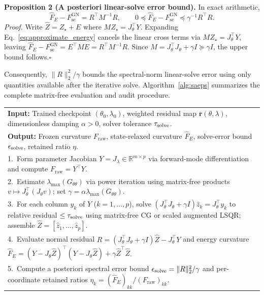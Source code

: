 \documentclass[preprint,11pt]{elsarticle}
\newcommand{\RR}{\mathbb R}
\newcommand{\rbar}{\bar{\bm r}}
\newcommand{\Jt}{J_\theta}\newcommand{\Jl}{J_\lambda}
\newcommand{\Fraw}{F_{\mathrm{raw}}}
\newcommand{\Fse}{F_{\mathrm{se}}^{\mathrm{GN}}}
\begin{document}
\medskip\noindent\textbf{Proposition 2 (A posteriori linear-solve error bound).}
In exact arithmetic,
\begin{equation}
 \widehat F_E-\Fse=R^\top M^{-1}R,\qquad
 0\preceq\widehat F_E-\Fse\preceq\gamma^{-1}R^\top R.
 \label{eq:energy_certificate}
\end{equation}
\emph{Proof.}
Write $\widehat Z=Z_\star+E$ where $MZ_\star=\Jt^\top Y$.
Expanding Eq.~\eqref{eq:approximate_energy} cancels the linear cross terms via $M Z_\star=\Jt^\top Y$, leaving $\widehat F_E-\Fse=E^\top M E=R^\top M^{-1}R$.
Since $M=\Jt^\top\Jt+\gamma I\succeq\gamma I$, the upper bound follows.\hfill$\square$

Consequently, $\|R\|_2^2/\gamma$ bounds the spectral-norm linear-solve error using only quantities available after the iterative solve.
Algorithm~\ref{alg:saeps} summarizes the complete matrix-free evaluation and audit procedure.

\begin{algorithm}[!htbp]
\centering
\small
\caption{Matrix-free SAEPS curvature evaluation and a posteriori energy audit.}
\label{alg:saeps}
\begin{tabular}{@{}p{.96\linewidth}@{}}
\toprule
\textbf{Input:} Trained checkpoint $(\theta_0,\lambda_0)$, weighted residual map $\rbar(\theta,\lambda)$, dimensionless damping $\alpha>0$, solver tolerance $\tau_{\rm solve}$.\\
\textbf{Output:} Frozen curvature $\Fraw$, state-relaxed curvature $\widehat F_E$, solve-error bound $\epsilon_{\rm solve}$, retained ratio $\eta$.\\
\midrule
1.\ Form parameter Jacobian $Y=\Jl\in\RR^{m\times p}$ via forward-mode differentiation and compute $\Fraw=Y^\top Y$.\\
2.\ Estimate $\lambda_{\max}(G_{\theta\theta})$ via power iteration using matrix-free products $v\mapsto\Jt^\top(\Jt v)$; set $\gamma=\alpha\lambda_{\max}(G_{\theta\theta})$.\\
3.\ For each column $y_k$ of $Y$ ($k=1,\dots,p$), solve $(\Jt^\top\Jt+\gamma I)\hat z_k=\Jt^\top y_k$ to relative residual $\le\tau_{\rm solve}$ using matrix-free CG or scaled augmented LSQR; assemble $\widehat Z=[\hat z_1,\dots,\hat z_p]$.\\
4.\ Evaluate normal residual $R=(\Jt^\top\Jt+\gamma I)\widehat Z-\Jt^\top Y$ and energy curvature $\widehat F_E=(Y-\Jt\widehat Z)^\top(Y-\Jt\widehat Z)+\gamma\widehat Z^\top\widehat Z$.\\
5.\ Compute a posteriori spectral error bound $\epsilon_{\rm solve}=\|R\|_2^2/\gamma$ and per-coordinate retained ratios $\eta_k=(\widehat F_E)_{kk}/(\Fraw)_{kk}$.\\
\bottomrule
\end{tabular}
\end{algorithm}
\end{document}
